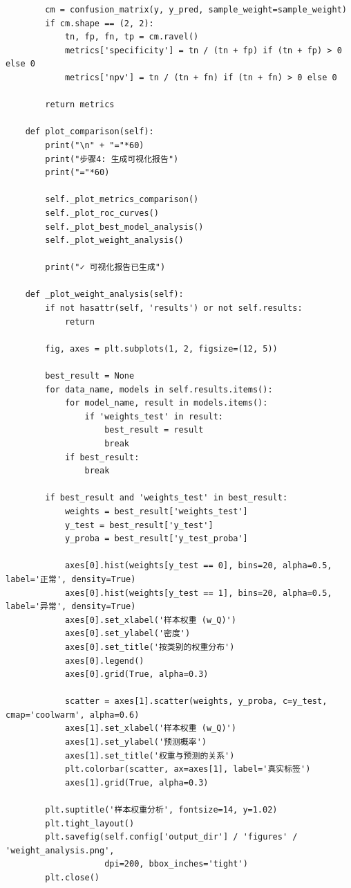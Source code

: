 \begin{lstlisting}
        cm = confusion_matrix(y, y_pred, sample_weight=sample_weight)
        if cm.shape == (2, 2):
            tn, fp, fn, tp = cm.ravel()
            metrics['specificity'] = tn / (tn + fp) if (tn + fp) > 0 else 0
            metrics['npv'] = tn / (tn + fn) if (tn + fn) > 0 else 0

        return metrics

    def plot_comparison(self):
        print("\n" + "="*60)
        print("步骤4: 生成可视化报告")
        print("="*60)

        self._plot_metrics_comparison()
        self._plot_roc_curves()
        self._plot_best_model_analysis()
        self._plot_weight_analysis()

        print("✓ 可视化报告已生成")

    def _plot_weight_analysis(self):
        if not hasattr(self, 'results') or not self.results:
            return

        fig, axes = plt.subplots(1, 2, figsize=(12, 5))

        best_result = None
        for data_name, models in self.results.items():
            for model_name, result in models.items():
                if 'weights_test' in result:
                    best_result = result
                    break
            if best_result:
                break

        if best_result and 'weights_test' in best_result:
            weights = best_result['weights_test']
            y_test = best_result['y_test']
            y_proba = best_result['y_test_proba']

            axes[0].hist(weights[y_test == 0], bins=20, alpha=0.5, label='正常', density=True)
            axes[0].hist(weights[y_test == 1], bins=20, alpha=0.5, label='异常', density=True)
            axes[0].set_xlabel('样本权重 (w_Q)')
            axes[0].set_ylabel('密度')
            axes[0].set_title('按类别的权重分布')
            axes[0].legend()
            axes[0].grid(True, alpha=0.3)

            scatter = axes[1].scatter(weights, y_proba, c=y_test, cmap='coolwarm', alpha=0.6)
            axes[1].set_xlabel('样本权重 (w_Q)')
            axes[1].set_ylabel('预测概率')
            axes[1].set_title('权重与预测的关系')
            plt.colorbar(scatter, ax=axes[1], label='真实标签')
            axes[1].grid(True, alpha=0.3)

        plt.suptitle('样本权重分析', fontsize=14, y=1.02)
        plt.tight_layout()
        plt.savefig(self.config['output_dir'] / 'figures' / 'weight_analysis.png',
                    dpi=200, bbox_inches='tight')
        plt.close()


\end{lstlisting}
